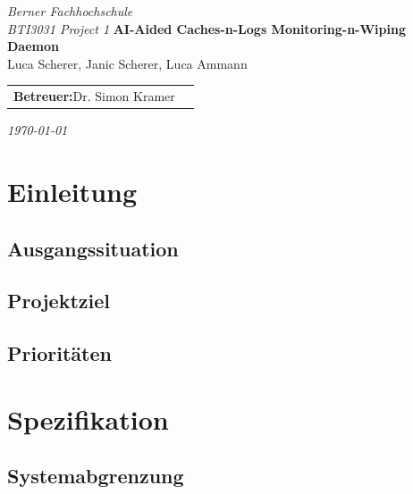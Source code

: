 \documentclass[a4paper,12pt]{report}
\begin{document}
    \begin{titlepage}
        \centering
        \textit{Berner Fachhochschule}\\[0.2em]
        \textit{BTI3031 Project 1}
        \vfill
        {\huge \textbf{AI-Aided Caches-n-Logs Monitoring-n-Wiping Daemon}}\\[4em]
        {\large Luca Scherer, Janic Scherer, Luca Ammann }\\[0.5em]
        \begin{tabular}{ll}
            \textbf{Betreuer:}\hspace{0.5em}Dr. Simon Kramer \\
        \end{tabular}

        \vfill
        \textit{\today}
    \end{titlepage}

    \begin{abstract}
        \ldots
    \end{abstract}

    \tableofcontents
    \listoftables
    \listoffigures
    \lstlistoflistings



    \chapter{Einleitung}


    \section{Ausgangssituation}


    \section{Projektziel}


    \section{Prioritäten}


    \chapter{Spezifikation}

    \newpage


    \section{Systemabgrenzung}
\end{document}
